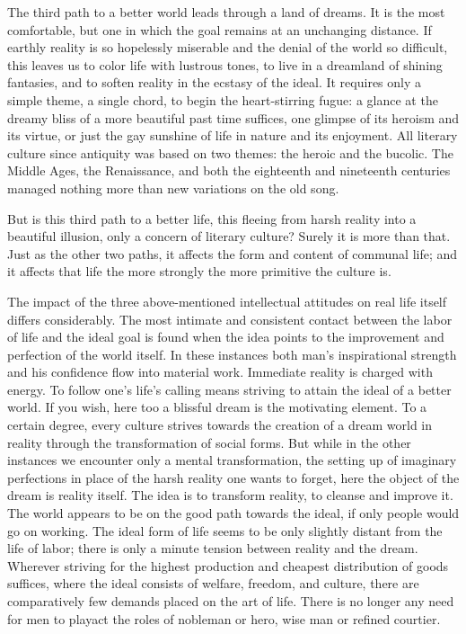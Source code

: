 The third path to a better world leads through a land of dreams. It is
the most comfortable, but one in which the goal remains at an unchanging
distance. If earthly reality is so hopelessly miserable
\protect\hypertarget{09_Chapter_Two__THE_CRAVING_FOR_A_M.xhtmlux5cux23page_38}{}{}and
the denial of the world so difficult, this leaves us to color life with
lustrous tones, to live in a dreamland of shining fantasies, and to
soften reality in the ecstasy of the ideal. It requires only a simple
theme, a single chord, to begin the heart-stirring fugue: a glance at
the dreamy bliss of a more beautiful past time suffices, one glimpse of
its heroism and its virtue, or just the gay sunshine of life in nature
and its enjoyment. All literary culture since antiquity was based on two
themes: the heroic and the bucolic. The Middle Ages, the Renaissance,
and both the eighteenth and nineteenth centuries managed nothing more
than new variations on the old song.

But is this third path to a better life, this fleeing from harsh reality
into a beautiful illusion, only a concern of literary culture? Surely it
is more than that. Just as the other two paths, it affects the form and
content of communal life; and it affects that life the more strongly the
more primitive the culture is.

The impact of the three above-mentioned intellectual attitudes on real
life itself differs considerably. The most intimate and consistent
contact between the labor of life and the ideal goal is found when the
idea points to the improvement and perfection of the world itself. In
these instances both man's inspirational strength and his confidence
flow into material work. Immediate reality is charged with energy. To
follow one's life's calling means striving to attain the ideal of a
better world. If you wish, here too a blissful dream is the motivating
element. To a certain degree, every culture strives towards the creation
of a dream world in reality through the transformation of social forms.
But while in the other instances we encounter only a mental
transformation, the setting up of imaginary perfections in place of the
harsh reality one wants to forget, here the object of the dream is
reality itself. The idea is to transform reality, to cleanse and improve
it. The world appears to be on the good path towards the ideal, if only
people would go on working. The ideal form of life seems to be only
slightly distant from the life of labor; there is only a minute tension
between reality and the dream. Wherever striving for the highest
production and cheapest distribution of goods suffices, where the ideal
consists of welfare, freedom, and culture, there are comparatively few
demands placed on the art of life. There is no longer any need for men
to playact the roles of nobleman or hero, wise man or refined courtier.

